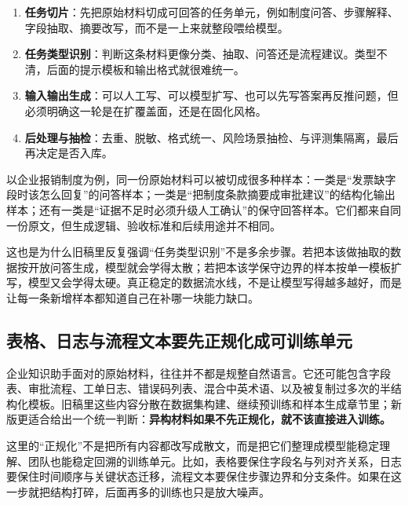 \begin{enumerate}
  \item \textbf{任务切片}：先把原始材料切成可回答的任务单元，例如制度问答、步骤解释、字段抽取、摘要改写，而不是一上来就整段喂给模型。
  \item \textbf{任务类型识别}：判断这条材料更像分类、抽取、问答还是流程建议。类型不清，后面的提示模板和输出格式就很难统一。
  \item \textbf{输入输出生成}：可以人工写、可以模型扩写、也可以先写答案再反推问题，但必须明确这一轮是在扩覆盖面，还是在固化风格。
  \item \textbf{后处理与抽检}：去重、脱敏、格式统一、风险场景抽检、与评测集隔离，最后再决定是否入库。
\end{enumerate}

以企业报销制度为例，同一份原始材料可以被切成很多种样本：一类是“发票缺字段时该怎么回复”的问答样本；一类是“把制度条款摘要成审批建议”的结构化输出样本；还有一类是“证据不足时必须升级人工确认”的保守回答样本。它们都来自同一份原文，但生成逻辑、验收标准和后续用途并不相同。

这也是为什么旧稿里反复强调“任务类型识别”不是多余步骤。若把本该做抽取的数据按开放问答生成，模型就会学得太散；若把本该学保守边界的样本按单一模板扩写，模型又会学得太硬。真正稳定的数据流水线，不是让模型写得越多越好，而是让每一条新增样本都知道自己在补哪一块能力缺口。

\subsection{表格、日志与流程文本要先正规化成可训练单元}
企业知识助手面对的原始材料，往往并不都是规整自然语言。它还可能包含字段表、审批流程、工单日志、错误码列表、混合中英术语、以及被复制过多次的半结构化模板。旧稿里这些内容分散在数据集构建、继续预训练和样本生成章节里；新版更适合给出一个统一判断：\textbf{异构材料如果不先正规化，就不该直接进入训练。}

这里的“正规化”不是把所有内容都改写成散文，而是把它们整理成模型能稳定理解、团队也能稳定回溯的训练单元。比如，表格要保住字段名与列对齐关系，日志要保住时间顺序与关键状态迁移，流程文本要保住步骤边界和分支条件。如果在这一步就把结构打碎，后面再多的训练也只是放大噪声。

